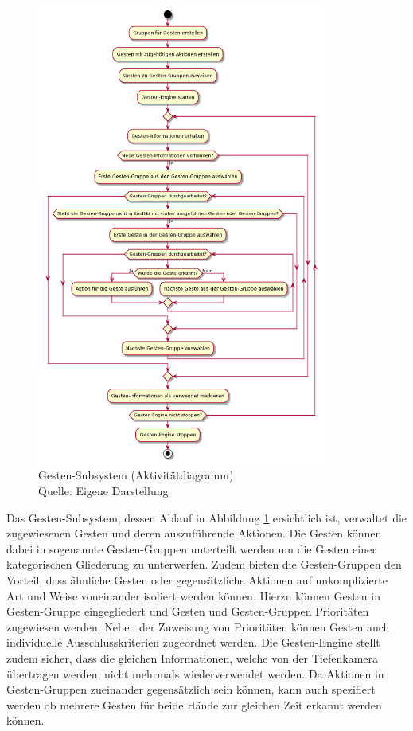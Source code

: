 \begin{figure}[htb]
	\centering
	\includegraphics[width=0.85\textwidth]{images/loesungsweg/gesture_subsystem_uml}
	\caption[Gesten-Subsystem (Aktivitätdiagramm)]{Gesten-Subsystem (Aktivitätdiagramm)\\Quelle: Eigene Darstellung}
	\label{fig:gesture_subsystem_uml}
\end{figure}
\FloatBarrier

Das Gesten-Subsystem, dessen Ablauf in Abbildung \ref{fig:gesture_subsystem_uml} ersichtlich ist, verwaltet die zugewiesenen Gesten und deren auszuführende Aktionen. Die Gesten können dabei in sogenannte Gesten-Gruppen unterteilt werden um die Gesten einer kategorischen Gliederung zu unterwerfen. Zudem bieten die Gesten-Gruppen den Vorteil, dass ähnliche Gesten oder gegensätzliche Aktionen auf unkomplizierte Art und Weise voneinander isoliert werden können. Hierzu können Gesten in Gesten-Gruppe eingegliedert und Gesten und Gesten-Gruppen Prioritäten zugewiesen werden. Neben der Zuweisung von Prioritäten können Gesten auch individuelle Ausschlusskriterien zugeordnet werden. Die Gesten-Engine stellt zudem sicher, dass die gleichen Informationen, welche von der Tiefenkamera übertragen werden, nicht mehrmals wiederverwendet werden. Da Aktionen in Gesten-Gruppen zueinander gegensätzlich sein können, kann auch spezifiert werden ob mehrere Gesten für beide Hände zur gleichen Zeit erkannt werden können.


